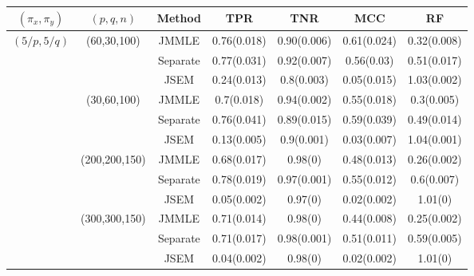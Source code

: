 \begin{scriptsize}
\begin{table}[t!]
    \begin{tabular}{ccccccc}
    \hline
    $(\pi_x, \pi_y)$ & $(p,q,n)$   & Method   & TPR            & TNR             & MCC & RF            \\ \hline
    $(5/p, 5/q)$   & (60,30,100)   & JMMLE    & 0.76(0.018) & 0.90(0.006)  & 0.61(0.024)  & 0.32(0.008) \\
    ~              & ~             & Separate & 0.77(0.031) & 0.92(0.007)  & 0.56(0.03)   & 0.51(0.017) \\
    ~              & ~             & JSEM     & 0.24(0.013) & 0.8(0.003)   & 0.05(0.015)  & 1.03(0.002)\\\cline{2-7}
    ~              & (30,60,100)   & JMMLE    & 0.7(0.018)  & 0.94(0.002)  & 0.55(0.018)  & 0.3(0.005) \\
    ~              & ~             & Separate & 0.76(0.041) & 0.89(0.015)  & 0.59(0.039)  & 0.49(0.014) \\
    ~              & ~             & JSEM     & 0.13(0.005) & 0.9(0.001)   & 0.03(0.007)  & 1.04(0.001) \\\cline{2-7}
    ~              & (200,200,150) & JMMLE    & 0.68(0.017) & 0.98(0)      & 0.48(0.013)  & 0.26(0.002) \\
    ~              & ~             & Separate & 0.78(0.019) & 0.97(0.001)  & 0.55(0.012)  & 0.6(0.007) \\
    ~              & ~             & JSEM     & 0.05(0.002) & 0.97(0)      & 0.02(0.002)  & 1.01(0) \\\cline{2-7}
    ~              & (300,300,150) & JMMLE    & 0.71(0.014) & 0.98(0)      & 0.44(0.008)  & 0.25(0.002) \\
    ~              & ~             & Separate & 0.71(0.017) & 0.98(0.001)  & 0.51(0.011)  & 0.59(0.005) \\
    ~              & ~             & JSEM     & 0.04(0.002) & 0.98(0)      & 0.02(0.002)  & 1.01(0)     \\\hline

\end{tabular}
\end{table}
\end{scriptsize}
